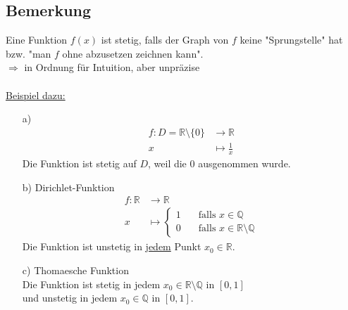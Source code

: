 \documentclass[12pt, titlepage]{article}
\newcommand{\R}{\mathds{R}}
\renewcommand{\>}{\rightarrow}
\renewcommand{\*}{\cdot}
\begin{document}
	\subsection{Bemerkung}
	Eine Funktion $f(x)$ ist stetig, falls der Graph von $f$ keine "Sprungstelle" hat bzw. "man $f$ ohne abzusetzen zeichnen kann".\\
	$\Rightarrow$ in Ordnung für Intuition, aber unpräzise\\
	\\
	\underline{Beispiel dazu:}
	\begin{itemize}
		\item[a)]
		\begin{align*}
			f\colon D=\R\setminus\{0\}&\>\R\\x&\mapsto\frac{1}{x}
		\end{align*}
		Die Funktion ist stetig auf $D$, weil die $0$ ausgenommen wurde.
		\item[b)] Dirichlet-Funktion
		\begin{align*}
			f\colon\R&\>\R\\
			x&\mapsto\begin{cases}1\quad&\textrm{falls }x\in\mathds{Q}\\
			0\quad&\textrm{falls }x\in\R\setminus\mathds{Q}
			\end{cases}
		\end{align*}
		Die Funktion ist unstetig in \underline{jedem} Punkt $x_0\in\R$.
		\item[c)] Thomaesche Funktion\\
		Die Funktion ist stetig in jedem $x_0\in\R\setminus\mathds{Q}$ in $[0,1]$\\
		und unstetig in jedem $x_0\in\mathds{Q}$ in $[0,1]$.
	\end{itemize}
\end{document}
